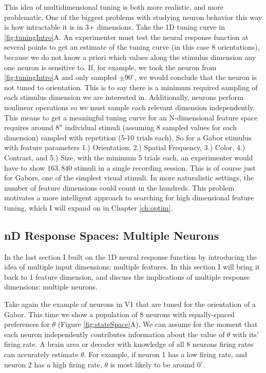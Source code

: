 This idea of multidimensional tuning is both more realistic, and more problematic. One of the biggest problems with studying neuron behavior this way is how intractable it is in 3+ dimensions. Take the 1D tuning curve in \ref{fig:tuningIntro}A. An experimenter must test the neural response function at several points to get an estimate of the tuning curve (in this case 8 orientations), because we do not know a priori which values along the stimulus dimension any one neuron is sensitive to. If, for example, we took the neuron from \ref{fig:tuningIntro}A and only sampled $\pm 90^\circ$, we would conclude that the neuron is not tuned to orientation. This is to say there is a minimum required sampling of each stimulus dimension we are interested in. Additionally, neurons perform nonlinear operations so we must sample each relevant dimension independently. This means to get a meaningful tuning curve for an N-dimensional feature space requires around $8^n$ individual stimuli (assuming 8 sampled values for each dimension) sampled with repetition (5-10 trials each). So for a Gabor stimulus with feature parameters 1.) Orientation, 2.) Spatial Frequency, 3.) Color, 4.) Contrast, and 5.) Size, with the minimum 5 trials each, an experimenter would have to show $163,840$ stimuli in a single recording session. This is of course just for Gabors, one of the simplest visual stimuli. In more naturalistic settings, the number of feature dimensions could count in the hundreds. This problem motivates a more intelligent approach to searching for high dimensional feature tuning, which I will expand on in Chapter \ref{ch:optim}.


\subsection{nD Response Spaces: Multiple Neurons}

In the last section I built on the 1D neural response function by introducing the idea of multiple input dimensions: multiple features. In this section I will bring it back to 1 feature dimension, and discuss the implications of multiple response dimensions: multiple neurons.

Take again the example of neurons in V1 that are tuned for the orientation of a Gabor. This time we show a population of 8 neurons with equally-spaced preferences for $\theta$ (Figure \ref{fig:stateSpace}A). We can assume for the moment that each neuron independently contributes information about the value of $\theta$ with its' firing rate. A brain area or decoder with knowledge of all 8 neurons firing rates can accurately estimate $\theta$. For example, if neuron 1 has a low firing rate, and neuron 2 has a high firing rate, $\theta$ is most likely to be around $0^\circ$.

